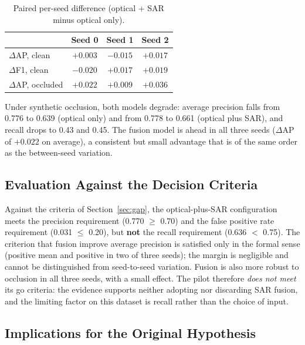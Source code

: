 \documentclass{article}
\begin{document}
\begin{table}[ht]
\centering
\caption{Paired per-seed difference (optical + SAR minus optical only).}
\label{tab:paired}
\small
\begin{tabular}{lccc}
\toprule
 & Seed 0 & Seed 1 & Seed 2 \\
\midrule
$\Delta$AP, clean    & $+0.003$ & $-0.015$ & $+0.017$ \\
$\Delta$F1, clean    & $-0.020$ & $+0.017$ & $+0.019$ \\
$\Delta$AP, occluded & $+0.022$ & $+0.009$ & $+0.036$ \\
\bottomrule
\end{tabular}
\end{table}

Under synthetic occlusion, both models degrade: average precision falls from
0.776 to 0.639 (optical only) and from 0.778 to 0.661 (optical plus SAR), and
recall drops to 0.43 and 0.45.
The fusion model is ahead in all three seeds ($\Delta$AP of $+0.022$ on
average), a consistent but small advantage that is of the same order as the
between-seed variation.

\subsection{Evaluation Against the Decision Criteria}

Against the criteria of Section~\ref{sec:gap}, the optical-plus-SAR
configuration meets the precision requirement (0.770 $\geq$ 0.70) and the false
positive rate requirement (0.031 $\leq$ 0.20), but \textbf{not} the recall
requirement (0.636 $<$ 0.75).
The criterion that fusion improve average precision is satisfied only in the
formal sense (positive mean and positive in two of three seeds); the margin is
negligible and cannot be distinguished from seed-to-seed variation.
Fusion is also more robust to occlusion in all three seeds, with a small effect.
The pilot therefore \emph{does not meet} its go criteria: the evidence supports
neither adopting nor discarding SAR fusion, and the limiting factor on this
dataset is recall rather than the choice of input.

\subsection{Implications for the Original Hypothesis}
\end{document}
